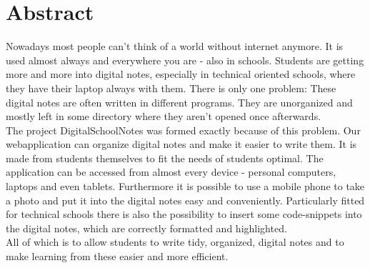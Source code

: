 \section*{Abstract}

Nowadays most people can't think of a world without internet anymore. It is used almost always and everywhere you are - also in schools. Students are getting more and more into digital notes, especially in technical oriented schools, where they have their laptop always with them. There is only one problem: These digital notes are often written in different programs. They are unorganized and mostly left in some directory where they aren't opened once afterwards.\\
The project DigitalSchoolNotes was formed exactly because of this problem. Our webapplication can organize digital notes and make it easier to write them. It is made from students themselves to fit the needs of students optimal. The application can be accessed from almost every device - personal computers, laptops and even tablets. Furthermore it is possible to use a mobile phone to take a photo and put it into the digital notes easy and conveniently. Particularly fitted for technical schools there is also the possibility to insert some code-snippets into the digital notes, which are correctly formatted and highlighted.\\
All of which is to allow students to write tidy, organized, digital notes and to make learning from these easier and more efficient.